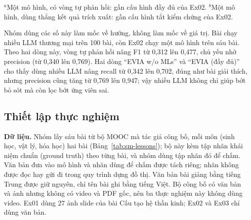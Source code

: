 \begin{table}[t]
\centering
\caption{Trích xuất khái niệm theo bài báo (chọn lọc).}
\label{tab:sm-pub}
\small
\setlength{\tabcolsep}{4pt}
\par\smallskip
{\footnotesize\raggedright $^{a}$Một mô hình, có vòng tự phản hồi: gần cấu hình đầy đủ của Ex02. $^{b}$Một mô hình, dùng thẳng kết quả trích xuất: gần cấu hình tắt kiểm chứng của Ex02.\par}
\end{table}

Nhóm dùng các số này làm mốc về hướng, không làm mốc về giá trị.
Bài chạy nhiều LLM thương mại trên 100 bài, còn Ex02 chạy một mô hình trên sáu bài.
Theo hai dòng này, vòng tự phản hồi nâng F1 từ 0,312 lên 0,477, chủ yếu nhờ precision (từ 0,340 lên 0,769).
Hai dòng ``EVIA w/o MLs'' và ``EVIA (đầy đủ)'' cho thấy dùng nhiều LLM nâng recall từ 0,342 lên 0,702, đúng như bài giải thích, nhưng precision cũng tăng từ 0,769 lên 0,947; vậy nhiều LLM không chỉ giúp bớt bỏ sót mà còn lọc bớt ứng viên sai.

\subsection{Thiết lập thực nghiệm}\label{sec:sm-exp-setup}
\textbf{Dữ liệu.}
Nhóm lấy sáu bài từ bộ MOOC mà tác giả công bố, mỗi môn (sinh học, vật lý, hóa học) hai bài (Bảng~\ref{tab:sm-lessons}); bộ này kèm tập nhãn khái niệm chuẩn (ground truth) theo từng bài, và nhóm dùng tập nhãn đó để chấm.
Văn bản đưa vào mô hình và nhãn dùng để chấm được tách riêng; nhãn không được đọc hay gửi đi trong quy trình dựng đồ thị.
Văn bản bài giảng bằng tiếng Trung được giữ nguyên, chỉ tên bài ghi bằng tiếng Việt.
Bộ công bố có văn bản và ảnh nhưng không có video và PDF gốc, nên ba thực nghiệm này không dùng video.
Ex01 dùng 27 ảnh slide của bài Cấu tạo hệ thần kinh; Ex02 và Ex03 chỉ dùng văn bản.

